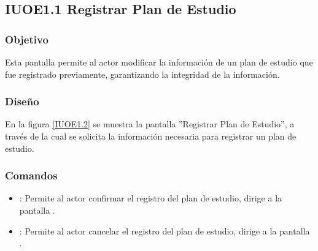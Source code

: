 \subsection{IUOE1.1 Registrar Plan de Estudio}

\subsubsection{Objetivo}
	Esta pantalla permite al actor modificar la información de un plan de estudio que fue registrado previamente, garantizando la integridad de la información.

\subsubsection{Diseño}

    En la figura \ref{IUOE1.2} se muestra la pantalla ''Registrar Plan de Estudio'', a través de la cual se solicita la información necesaria para registrar un plan de estudio.
 

\subsubsection{Comandos}
    \begin{itemize}
	\item {}: Permite al actor confirmar el registro del plan de estudio, dirige a la pantalla .
	
	\item {}: Permite al actor cancelar el registro del plan de estudio, dirige a la pantalla .
    \end{itemize}
